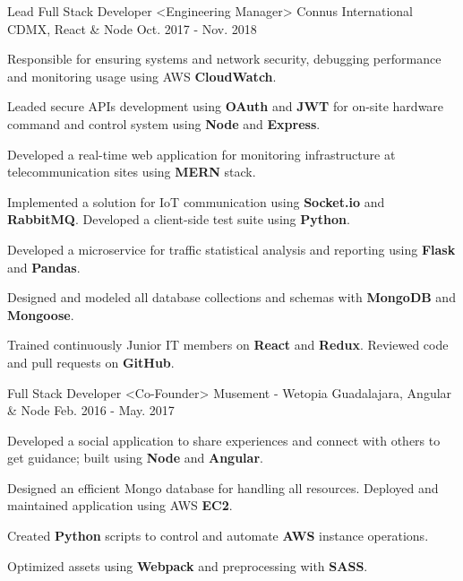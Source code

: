 \begin{cventries}
{    }
  \cventry
    {Lead Full Stack Developer <Engineering Manager>}
    {Connus International}
    {CDMX, React \& Node}
    {Oct. 2017 - Nov. 2018}
    {
      \begin{cvitems}
        \item {Responsible for ensuring systems and network security, debugging performance and monitoring usage using AWS \textbf{CloudWatch}.}
        \item {Leaded secure APIs development using \textbf{OAuth} and \textbf{JWT} for on-site hardware command and control system using \textbf{Node} and \textbf{Express}.}
        \item {Developed a real-time web application for monitoring infrastructure at telecommunication sites using \textbf{MERN} stack.}
        \item {Implemented a solution for IoT communication using \textbf{Socket.io} and \textbf{RabbitMQ}. Developed a client-side test suite using \textbf{Python}.}
        \item {Developed a microservice for traffic statistical analysis and reporting using \textbf{Flask} and \textbf{Pandas}.}
        \item {Designed and modeled all database collections and schemas with \textbf{MongoDB} and \textbf{Mongoose}.}
        \item {Trained continuously Junior IT members on \textbf{React} and \textbf{Redux}. Reviewed code and pull requests on \textbf{GitHub}.}
      \end{cvitems}
    }
  \cventry
    {Full Stack Developer <Co-Founder>}
    {Musement - Wetopia}
    {Guadalajara, Angular \& Node}
    {Feb. 2016 - May. 2017}
    {
      \begin{cvitems}
        \item {Developed a social application to share experiences and connect with others to get guidance; built using \textbf{Node} and \textbf{Angular}.}
        \item {Designed an efficient Mongo database for handling all resources. Deployed and maintained application using AWS \textbf{EC2}.}
        \item {Created \textbf{Python} scripts to control and automate \textbf{AWS} instance operations.}
        \item {Optimized assets using \textbf{Webpack} and preprocessing with \textbf{SASS}.}
      \end{cvitems}
    }
\end{cventries}
